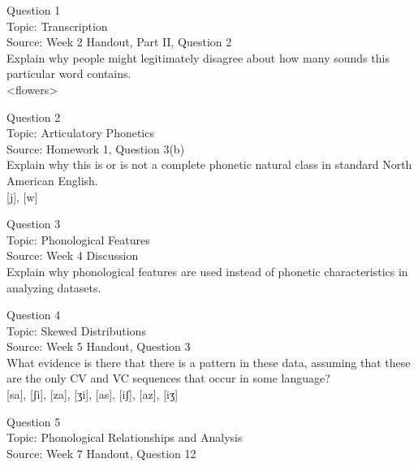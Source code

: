 \documentclass[12pt]{article}
\begin{document}
{\large Question 1}\\

Topic: Transcription\\
Source: Week 2 Handout, Part II, Question 2\\

Explain why people might legitimately disagree about how many sounds this particular word contains.\\

<flowers>


\newpage

{\large Question 2}\\

Topic: Articulatory Phonetics\\
Source: Homework 1, Question 3(b)\\

Explain why this is or is not a complete phonetic natural class in standard North American English.\\

{[j]}, {[w]}


\newpage

{\large Question 3}\\

Topic: Phonological Features\\
Source: Week 4 Discussion\\

Explain why phonological features are used instead of phonetic characteristics in analyzing datasets.\\


\newpage

{\large Question 4}\\

Topic: Skewed Distributions\\
Source: Week 5 Handout, Question 3\\

What evidence is there that there is a pattern in these data, assuming that these are the only CV and VC sequences that occur in some language?\\

{[sa]}, {[ʃi]}, {[za]}, {[ʒi]}, {[as]}, {[iʃ]}, {[az]}, {[iʒ]}


\newpage

{\large Question 5}\\

Topic: Phonological Relationships and Analysis\\
Source: Week 7 Handout, Question 12\\
\end{document}
